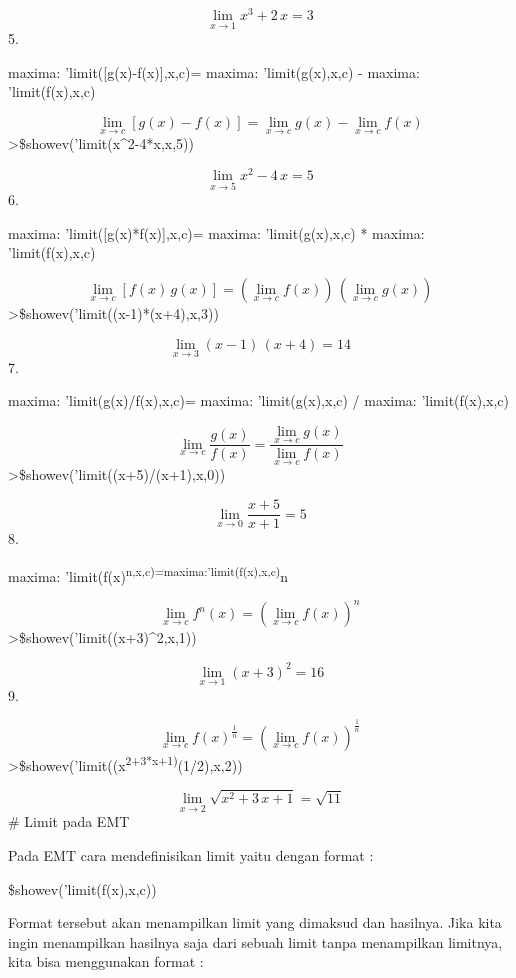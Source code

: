 \documentclass[
]{book}
\begin{document}
\[\lim_{x\rightarrow 1}{x^3+2\,x}=3\]5.

maxima: 'limit({[}g(x)-f(x){]},x,c)= maxima: 'limit(g(x),x,c) - maxima: 'limit(f(x),x,c)

\[\lim_{x\rightarrow c}{\left[ g\left(x\right)-f\left(x\right)   \right] }=\lim_{x\rightarrow c}{g\left(x\right)}-\lim_{x  \rightarrow c}{f\left(x\right)}\]\textgreater\$showev('limit(x\^{}2-4*x,x,5))

\[\lim_{x\rightarrow 5}{x^2-4\,x}=5\]6.

maxima: 'limit({[}g(x)*f(x){]},x,c)= maxima: 'limit(g(x),x,c) * maxima: 'limit(f(x),x,c)

\[\lim_{x\rightarrow c}{\left[ f\left(x\right)\,g\left(x\right)   \right] }=\left(\lim_{x\rightarrow c}{f\left(x\right)}\right)\,  \left(\lim_{x\rightarrow c}{g\left(x\right)}\right)\]\textgreater\$showev('limit((x-1)*(x+4),x,3))

\[\lim_{x\rightarrow 3}{\left(x-1\right)\,\left(x+4\right)}=14\]7.

maxima: 'limit(g(x)/f(x),x,c)= maxima: 'limit(g(x),x,c) / maxima: 'limit(f(x),x,c)

\[\lim_{x\rightarrow c}{\frac{g\left(x\right)}{f\left(x\right)}}=  \frac{\lim_{x\rightarrow c}{g\left(x\right)}}{\lim_{x\rightarrow c}{  f\left(x\right)}}\]\textgreater\$showev('limit((x+5)/(x+1),x,0))

\[\lim_{x\rightarrow 0}{\frac{x+5}{x+1}}=5\]8.

maxima: 'limit(f(x)\textsuperscript{n,x,c)=maxima:'limit(f(x),x,c)}n

\[\lim_{x\rightarrow c}{f^{n}\left(x\right)}=\left(\lim_{x  \rightarrow c}{f\left(x\right)}\right)^{n}\]\textgreater\$showev('limit((x+3)\^{}2,x,1))

\[\lim_{x\rightarrow 1}{\left(x+3\right)^2}=16\]9.

\[\lim_{x\rightarrow c}{f\left(x\right)^{\frac{1}{n}}}=\left(\lim_{x  \rightarrow c}{f\left(x\right)}\right)^{\frac{1}{n}}\]\textgreater\$showev('limit((x\textsuperscript{2+3*x+1)}(1/2),x,2))

\[\lim_{x\rightarrow 2}{\sqrt{x^2+3\,x+1}}=\sqrt{11}\]\# Limit pada EMT

Pada EMT cara mendefinisikan limit yaitu dengan format :

\$showev('limit(f(x),x,c))

Format tersebut akan menampilkan limit yang dimaksud dan hasilnya. Jika kita ingin menampilkan hasilnya saja dari sebuah limit tanpa menampilkan limitnya, kita bisa menggunakan format :
\end{document}
